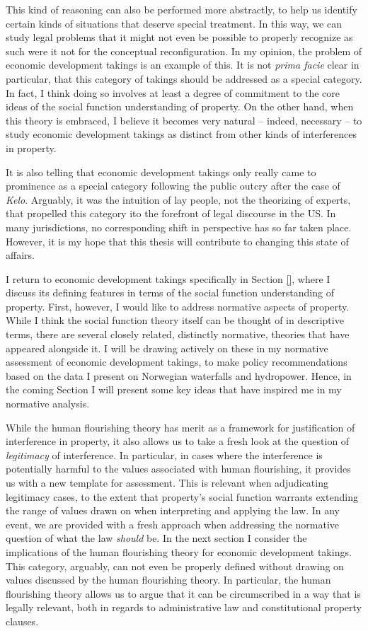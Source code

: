 This kind of reasoning can also be performed more abstractly, to help us identify certain kinds of situations that deserve special treatment. In this way, we can study legal problems that it might not even be possible to properly recognize as such were it not for the conceptual reconfiguration. In my opinion, the problem of economic development takings is an example of this. It is not {\it prima facie} clear in particular, that this category of takings should be addressed as a special category. In fact, I think doing so involves at least a degree of commitment to the core ideas of the social function understanding of property. On the other hand, when this theory is embraced, I believe it becomes very natural -- indeed, necessary -- to study economic development takings as distinct from other kinds of interferences in property. 

It is also telling that economic development takings only really came to prominence as a special category following the public outcry after the case of {\it Kelo}. Arguably, it was the intuition of lay people, not the theorizing of experts, that propelled this category ito the forefront of legal discourse in the US. In many jurisdictions, no corresponding shift in perspective has so far taken place. However, it is my hope that this thesis will contribute to changing this state of affairs.

I return to economic development takings specifically in Section \ref{}, where I discuss its defining features in terms of the social function understanding of property. First, however, I would like to address normative aspects of property. While I think the social function theory itself can be thought of in  descriptive terms, there are several closely related, distinctly normative, theories that have appeared alongside it. I will be drawing actively on these in my normative assessment of economic development takings, to make policy recommendations based on the data I present on Norwegian waterfalls and hydropower. Hence, in the coming Section I will present some key ideas that have inspired me in my normative analysis.

While the human flourishing theory has merit as a framework for justification of interference in property, it also allows us to take a fresh look at the question of {\it legitimacy} of interference. In particular, in cases where the interference is potentially harmful to the values associated with human flourishing, it provides us with a new template for assessment. This is relevant when adjudicating legitimacy cases, to the extent that property's social function warrants extending the range of values drawn on when interpreting and applying the law. In any event, we are provided with a fresh approach when addressing the normative question of what the law {\it should} be. In the next section I consider the implications of the human flourishing theory for economic development takings. This category, arguably, can not even be properly defined without drawing on values discussed by the human flourishing theory. In particular, the human flourishing theory allows us to argue that it can be circumscribed in a way that is legally relevant, both in regards to administrative law and constitutional property clauses. 

